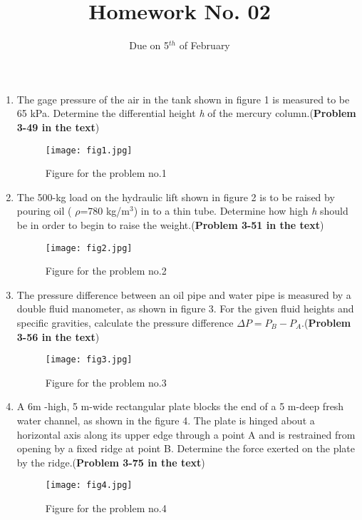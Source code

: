 \documentclass[11pt]{article}
\title{\textbf{Homework No. 02}}
\author{Due on 5$^{th}$ of February}
\date{}
\begin{document}
\maketitle

\begin{enumerate}
\item The gage pressure of the air in the tank shown in figure 1 is measured to be 65 kPa. Determine the differential height {\it h} of the mercury column.({\bf Problem 3-49 in the text})
\begin{figure}
\centering
\texttt{[image: fig1.jpg]}
\caption{Figure for the problem no.1}
\label{fig1}
\end{figure}
 
\item The 500-kg load on the hydraulic lift shown in figure 2 is to be raised by pouring oil ( $\rho$=780 kg/m$^3$) in to a thin tube. Determine how high {\it h} should be in order to begin to raise the weight.({\bf Problem 3-51 in the text})
\begin{figure}
\centering
\texttt{[image: fig2.jpg]}
\caption{Figure for the problem no.2}
\label{fig1}
\end{figure}

\item The pressure difference between an oil pipe and water pipe is measured by a double fluid manometer, as shown in figure 3. For the given fluid heights and specific gravities, calculate the pressure difference {\bf $\Delta P= P_B-P_A$}.({\bf Problem 3-56 in the text})

\begin{figure}
\centering
\texttt{[image: fig3.jpg]}
\caption{Figure for the problem no.3}
\label{fig1}
\end{figure}


\item A 6m -high, 5 m-wide rectangular plate blocks the end of a 5 m-deep fresh water channel, as shown in the figure 4. The plate is hinged about a horizontal axis along its upper edge through a point A and is restrained from opening by a fixed ridge at point B. Determine the force exerted on the plate by the ridge.({\bf Problem 3-75 in the text})

\begin{figure}
\centering
\texttt{[image: fig4.jpg]}
\caption{Figure for the problem no.4}
\label{fig1}
\end{figure}



\end{enumerate}


 
\end{document}
